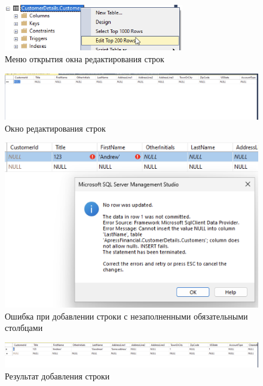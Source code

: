 \documentclass[a4paper, 14pt]{extarticle}
\begin{document}
\begin{figure}[H]
  \centering
  \includegraphics[width=0.7\textwidth]{images/task-1/5.png}
  \caption{Меню открытия окна редактирования строк}
  \label{fig:task-1-5}
\end{figure}

\begin{figure}[H]
  \centering
  \includegraphics[width=\textwidth]{images/task-1/6.png}
  \caption{Окно редактирования строк}
  \label{fig:task-1-6}
\end{figure}

\begin{figure}[H]
  \centering
  \includegraphics[width=\textwidth]{images/task-1/7.png}
  \caption{Ошибка при добавлении строки с незаполненными обязательными
    столбцами}
  \label{fig:task-1-7}
\end{figure}

\begin{figure}[H]
  \centering
  \includegraphics[width=\textwidth]{images/task-1/8.png}
  \caption{Результат добавления строки}
  \label{fig:task-1-8}
\end{figure}
\end{document}
